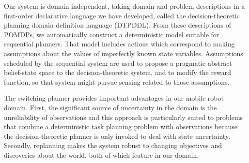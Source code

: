 \documentclass{article}
\begin{document}

Our system is domain independent, taking domain and problem
descriptions in a first-order declarative language we have developed,
called the decision-theoretic planning domain definition language
(DTPDDL). From these descriptions of POMDPs, we automatically
construct a deterministic model suitable for sequential planners. That
model includes actions which correspond to making assumptions about
the values of imperfectly known state variables. Assumptions scheduled
by the sequential system are used to propose a pragmatic abstract
belief-state space to the decision-theoretic system, and to modify the
reward function, so that system might pursue sensing related to those
assumptions.





The switching planner provides important advantages in our
mobile robot domain. First, the significant source of uncertainty in the
domain is the unreliability of observations and this approach is
particularly suited to problems that combine a deterministic task
planning problem with observations because the decision-theoretic planner
is only invoked to deal with state uncertainty.
Secondly, replanning makes the system robust to
changing objectives and discoveries about the world,
both of which feature in our domain.
\end{document}
